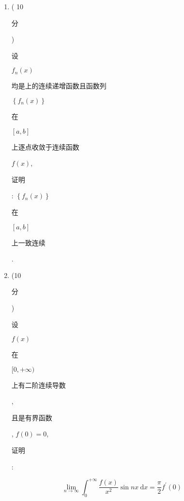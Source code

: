 \documentclass[10pt]{article}
\begin{document}
\begin{enumerate}
  \item ( 10 \begin{CJK}{UTF8}{mj}分\end{CJK}) \begin{CJK}{UTF8}{mj}设\end{CJK} $f_{n}(x)$ \begin{CJK}{UTF8}{mj}均是上的连续递增函数且函数列\end{CJK} $\left\{f_{n}(x)\right\}$ \begin{CJK}{UTF8}{mj}在\end{CJK} $[a, b]$ \begin{CJK}{UTF8}{mj}上逐点收敛于连续函数\end{CJK} $f(x)$, \begin{CJK}{UTF8}{mj}证明\end{CJK}: $\left\{f_{n}(x)\right\}$ \begin{CJK}{UTF8}{mj}在\end{CJK} $[a, b]$ \begin{CJK}{UTF8}{mj}上一致连续\end{CJK}.

  \item (10 \begin{CJK}{UTF8}{mj}分\end{CJK}) \begin{CJK}{UTF8}{mj}设\end{CJK} $f(x)$ \begin{CJK}{UTF8}{mj}在\end{CJK} $[0,+\infty)$ \begin{CJK}{UTF8}{mj}上有二阶连续导数\end{CJK}, \begin{CJK}{UTF8}{mj}且是有界函数\end{CJK}, $f(0)=0$, \begin{CJK}{UTF8}{mj}证明\end{CJK}:

\end{enumerate}
$$
\lim _{n \rightarrow \infty} \int_{0}^{+\infty} \frac{f(x)}{x^{2}} \sin n x \mathrm{~d} x=\frac{\pi}{2} f^{\prime}(0)
$$
\end{document}
